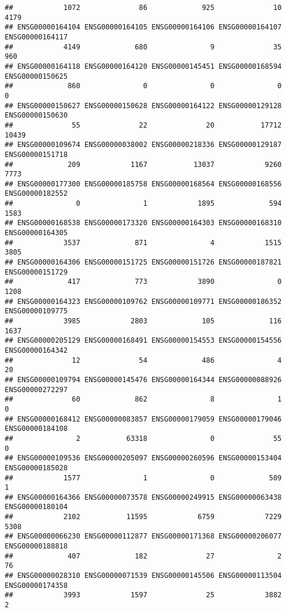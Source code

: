 \documentclass[
]{article}
\begin{document}
\begin{verbatim}
##            1072              86             925              10            4179 
## ENSG00000164104 ENSG00000164105 ENSG00000164106 ENSG00000164107 ENSG00000164117 
##            4149             680               9              35             960 
## ENSG00000164118 ENSG00000164120 ENSG00000145451 ENSG00000168594 ENSG00000150625 
##             860               0               0               0               0 
## ENSG00000150627 ENSG00000150628 ENSG00000164122 ENSG00000129128 ENSG00000150630 
##              55              22              20           17712           10439 
## ENSG00000109674 ENSG00000038002 ENSG00000218336 ENSG00000129187 ENSG00000151718 
##             209            1167           13037            9260            7773 
## ENSG00000177300 ENSG00000185758 ENSG00000168564 ENSG00000168556 ENSG00000182552 
##               0               1            1895             594            1583 
## ENSG00000168538 ENSG00000173320 ENSG00000164303 ENSG00000168310 ENSG00000164305 
##            3537             871               4            1515            3805 
## ENSG00000164306 ENSG00000151725 ENSG00000151726 ENSG00000187821 ENSG00000151729 
##             417             773            3890               0            1208 
## ENSG00000164323 ENSG00000109762 ENSG00000109771 ENSG00000186352 ENSG00000109775 
##            3985            2803             105             116            1637 
## ENSG00000205129 ENSG00000168491 ENSG00000154553 ENSG00000154556 ENSG00000164342 
##              12              54             486               4              20 
## ENSG00000109794 ENSG00000145476 ENSG00000164344 ENSG00000088926 ENSG00000272297 
##              60             862               8               1               0 
## ENSG00000168412 ENSG00000083857 ENSG00000179059 ENSG00000179046 ENSG00000184108 
##               2           63318               0              55               0 
## ENSG00000109536 ENSG00000205097 ENSG00000260596 ENSG00000153404 ENSG00000185028 
##            1577               1               0             509               1 
## ENSG00000164366 ENSG00000073578 ENSG00000249915 ENSG00000063438 ENSG00000180104 
##            2102           11595            6759            7229            5308 
## ENSG00000066230 ENSG00000112877 ENSG00000171368 ENSG00000206077 ENSG00000188818 
##             407             182              27               2              76 
## ENSG00000028310 ENSG00000071539 ENSG00000145506 ENSG00000113504 ENSG00000174358 
##            3993            1597              25            3882               2 

\end{verbatim}
\end{document}
